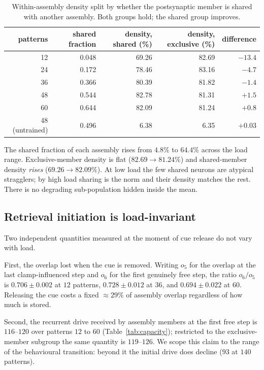 \documentclass[10pt,twocolumn,a4paper]{article}
\newcommand{\pct}{\%}
\begin{document}
\begin{table}[!t]
\centering
\caption{Within-assembly density split by whether the postsynaptic member is shared with
another assembly. Both groups hold; the shared group improves.}
\label{tab:subgroups}
\small
\begin{tabular}{rrrrr}
\toprule
patterns & shared fraction & density, shared (\pct) & density, exclusive (\pct) & difference \\
\midrule
12 & 0.048 & 69.26 & 82.69 & $-13.4$ \\
24 & 0.172 & 78.46 & 83.16 & $-4.7$ \\
36 & 0.366 & 80.39 & 81.82 & $-1.4$ \\
48 & 0.544 & 82.78 & 81.31 & $+1.5$ \\
60 & 0.644 & 82.09 & 81.24 & $+0.8$ \\
\midrule
48 (untrained) & 0.496 & 6.38 & 6.35 & $+0.03$ \\
\bottomrule
\end{tabular}
\end{table}

The shared fraction of each assembly rises from $4.8\pct$ to $64.4\pct$ across the load
range. Exclusive-member density is flat ($82.69 \to 81.24\pct$) and shared-member density
\emph{rises} ($69.26 \to 82.09\pct$). At low load the few shared neurons are atypical
stragglers; by high load sharing is the norm and their density matches the rest. There is
no degrading sub-population hidden inside the mean.

\subsection{Retrieval initiation is load-invariant}
\label{sec:initiation}

Two independent quantities measured at the moment of cue release do not vary with load.

First, the overlap lost when the cue is removed. Writing $o_5$ for the overlap at the last
clamp-influenced step and $o_6$ for the first genuinely free step, the ratio $o_6/o_5$ is
$0.706 \pm 0.002$ at $12$ patterns, $0.728 \pm 0.012$ at $36$, and $0.694 \pm 0.022$ at
$60$.
Releasing the cue costs a fixed $\approx 29\pct$ of assembly overlap regardless of how
much is stored.

Second, the recurrent drive received by assembly members at the first free step is
$116$--$120$ over patterns $12$ to $60$ (Table~\ref{tab:capacity}); restricted to the
exclusive-member subgroup the same quantity is $119$--$126$. We scope this claim to the
range of the behavioural transition: beyond it the initial drive does decline ($93$ at
$140$ patterns).
\end{document}
